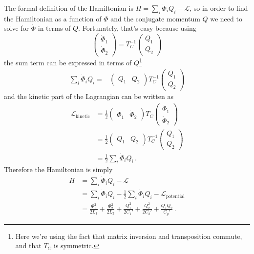 The formal definition of the Hamiltonian is $H = \sum_i \dot \Phi_i Q_i - \mathcal{L}$, so in order to find the Hamiltonian as a function of $\Phi$ and the conjugate momentum $Q$ we need to solve for $\dot \Phi$ in terms of $Q$.
Fortunately, that's easy because using
\begin{equation*}
  \left( \begin{array}{c} \dot \Phi_1 \\ \dot \Phi_2 \end{array} \right)
  =
  T_C^{-1}
  \left( \begin{array}{c} Q_1 \\ Q_2 \end{array} \right)
\end{equation*}
the sum term can be expressed in terms of $Q$\footnote{Here we're using the fact that matrix inversion and transposition commute, and that $T_C$ is symmetric.}
\begin{align*}
  \sum_i \dot \Phi_i Q_i
  =& \left( \begin{array}{cc} Q_1 & Q_2 \end{array} \right)
  T_C^{-1}
  \left( \begin{array}{c} Q_1 \\ Q_2 \end{array} \right)
\end{align*}
and the kinetic part of the Lagrangian can be written as
\begin{align*}
  \mathcal{L}_\text{kinetic}
  &= \frac{1}{2}
    \left( \begin{array}{cc} \dot{\Phi}_1 & \dot{\Phi}_2 \end{array} \right)
    T_C
    \left( \begin{array}{c} \dot{\Phi}_1 \\ \dot{\Phi}_2 \end{array} \right) \\
  &= \frac{1}{2} 
    \left( \begin{array}{cc} Q_1 & Q_2 \end{array} \right)
    T_C^{-1}
    \left( \begin{array}{c} Q_1 \\ Q_2 \end{array} \right) \\
  &= \frac{1}{2} \sum_i \dot \Phi_i Q_i
    \, .
\end{align*}
Therefore the Hamiltonian is simply
\begin{align*}
  H
  &= \sum_i \dot \Phi_i Q_i - \mathcal{L} \\
  &= \sum_i \dot \Phi_i Q_i - \frac{1}{2} \sum_i \dot \Phi_i Q_i - \mathcal{L}_\text{potential} \\
  &=
    \frac{\Phi_1^2}{2 L_1}
  + \frac{\Phi_2^2}{2 L_2}
  + \frac{Q_1^2}{2 C_1'}
  + \frac{Q_2^2}{2 C_2'}
  + \frac{Q_1 Q_2}{C_g'} \, .
\end{align*}

